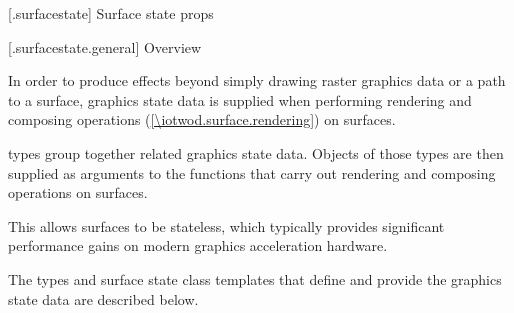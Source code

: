 
 [\iotwod.surfacestate] {Surface state props}

 [\iotwod.surfacestate.general] {Overview}

\pnum
In order to produce effects beyond simply drawing raster graphics data or a path to a surface, graphics state data is supplied when performing rendering and composing operations (\ref{\iotwod.surface.rendering}) on surfaces.

\pnum
{} types group together related graphics state data. Objects of those types are then supplied as arguments to the functions that carry out rendering and composing operations on surfaces. \begin{note}This allows surfaces to be stateless, which typically provides significant performance gains on modern graphics acceleration hardware.\end{note}

\pnum
The  types and surface state class templates that define and provide the graphics state data are described below.

\addtocounter{SectionDepthBase}{1}














\addtocounter{SectionDepthBase}{-1}
